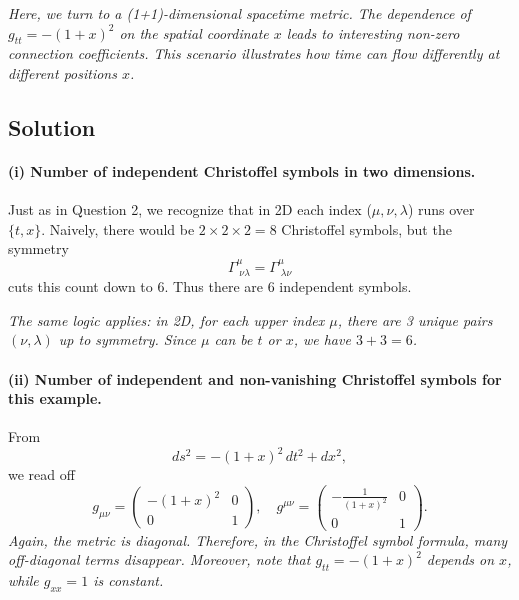 \emph{Here, we turn to a  (1+1)-dimensional  spacetime metric. The dependence of \(g_{tt} = -(1+x)^2\) on the spatial coordinate \(x\) leads to interesting non-zero connection coefficients. This scenario illustrates how time can  flow differently  at different positions \(x\).}

\subsection*{Solution}

\paragraph{(i) Number of independent Christoffel symbols in two dimensions.}

Just as in Question 2, we recognize that in 2D each index (\(\mu,\nu,\lambda\)) runs over \(\{t,x\}\). Naively, there would be \(2 \times 2 \times 2 = 8\) Christoffel symbols, but the symmetry
\[
\Gamma^\mu_{\;\nu\lambda} = \Gamma^\mu_{\;\lambda\nu}
\]
cuts this count down to \(6\). Thus there are \(\boxed{6}\) independent symbols.

\emph{The same logic applies: in 2D, for each upper index \(\mu\), there are 3 unique pairs \((\nu,\lambda)\) up to symmetry. Since \(\mu\) can be \(t\) or \(x\), we have \(3+3 = 6\).}

\paragraph{(ii) Number of independent and non-vanishing Christoffel symbols for this example.}

From
\[
ds^2 = -(1+x)^2 \, dt^2 + dx^2,
\]
we read off
\[
g_{\mu\nu} =
\begin{pmatrix}
-(1+x)^2 & 0 \\
0 & 1
\end{pmatrix},
\quad
g^{\mu\nu} =
\begin{pmatrix}
-\frac{1}{(1+x)^2} & 0 \\
0 & 1
\end{pmatrix}.
\]
\emph{Again, the metric is diagonal. Therefore, in the Christoffel symbol formula, many off-diagonal terms disappear. Moreover, note that \(g_{tt} = -(1+x)^2\) depends on \(x\), while \(g_{xx} = 1\) is constant.}

